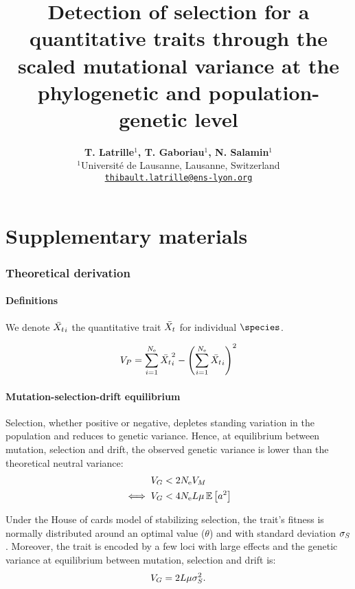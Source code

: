 \documentclass{article}
\title{Detection of selection for a quantitative traits through the scaled mutational variance at the phylogenetic and population-genetic level}
\author{
    \large
    \textbf{T. {Latrille}$^{1}$, T. {Gaboriau}$^{1}$, N. {Salamin}$^{1}$}\\
    \normalsize
    $^{1}$Université de Lausanne, Lausanne, Switzerland\\
    \texttt{\href{mailto:thibault.latrille@ens-lyon.org}{thibault.latrille@ens-lyon.org}} \\
}
\date{}
\begin{document}
    \maketitle
    \part*{Supplementary materials}
    \tableofcontents
    \clearpage

    \section{Theoretical derivation}
    \subsection{Definitions}

    We denote $\bar{X_{t}}_{i}$ the quantitative trait $\bar{X_{t}}$ for individual $\species$.

    \begin{align}
        V_{P} = \sum_{i=1}^{N_{\text{e}}} \bar{X_{t}}_{i}^2 - \left( \sum_{i=1}^{N_{\text{e}}} \bar{X_{t}}_{i} \right)^2
    \end{align}

    \subsection{Mutation-selection-drift equilibrium}

    Selection, whether positive or negative, depletes standing variation in the population and reduces to genetic variance.
    Hence, at equilibrium between mutation, selection and drift, the observed genetic variance is lower than the theoretical neutral variance:
    \begin{align}
        V_{G} & < 2 N_{\text{e}} V_{M} \\
        \iff V_{G} & < 4 N_{\text{e}} L \mu \operatorname{\mathbb{E}} \left[ a^2 \right]
    \end{align}

    Under the House of cards model of stabilizing selection\cite{kingman_simple_1978}, the trait's fitness is normally distributed around an optimal value ($\theta$) and with standard deviation $\sigma_S$.
    Moreover, the trait is encoded by a few loci with large effects and the genetic variance at equilibrium between mutation, selection and drift is:
    \begin{gather}
        V_{G} = 2 L \mu \sigma^2_S \label{eq-mutsel-HC}.
    \end{gather}
\end{document}
